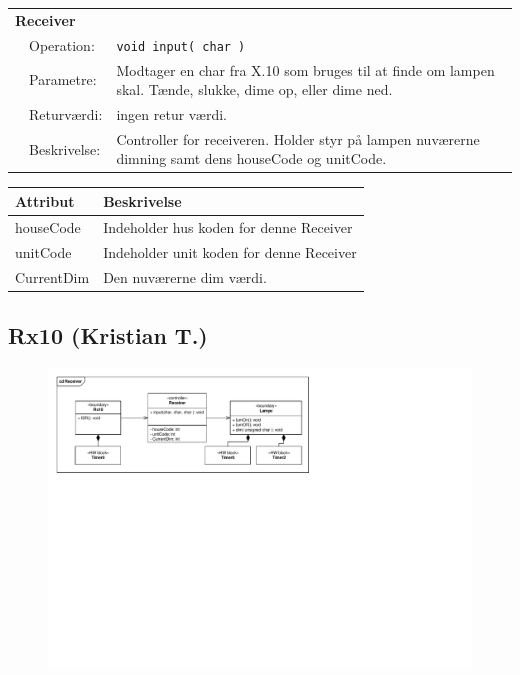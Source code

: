 \begin{table}[h]
\begin{tabularx}{\textwidth}{p{0.6 cm} l X} %
\multicolumn{3}{l}{\textbf{Receiver}}\\
& Operation: & %
\texttt{void input( char )} 
\\ & Parametre: & %
Modtager en char fra X.10 som bruges til at finde om lampen skal. Tænde, slukke, dime op, eller dime ned.
\\ & Returværdi: & %
ingen retur værdi. 
\\ & Beskrivelse: & %
Controller for receiveren. Holder styr på lampen nuværerne dimning samt dens houseCode og unitCode.
\\ \end{tabularx}
\end{table}

\begin{table}[h]
\centering
\begin{tabularx}{13 cm}{|l |X|} \hline
Attribut & Beskrivelse \\ \hline

houseCode & Indeholder hus koden for denne Receiver \\ \hline
unitCode  & Indeholder unit koden for denne Receiver \\ \hline
CurrentDim & Den nuværerne dim værdi. \\ \hline

\end{tabularx}
\end{table}

\clearpage

\subsection{Rx10 (Kristian T.)}

\begin{figure}[h]
\centering
\includegraphics[scale=1,clip=true, trim=38 462 696 66]{Systemarkitektur/diagrammer/Receiver_KlasseDiagram} %
\end{figure}

